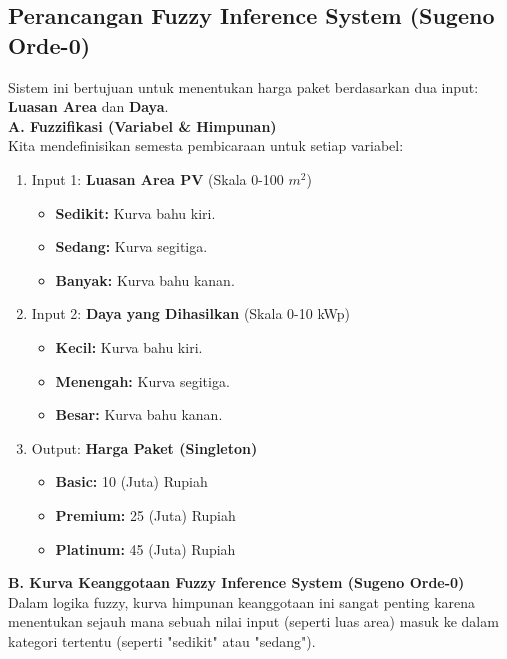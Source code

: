 \documentclass{article}
\begin{document}
\subsection*{Perancangan Fuzzy Inference System (Sugeno Orde-0)}
Sistem ini bertujuan untuk menentukan harga paket berdasarkan dua input: \textbf{Luasan Area} dan \textbf{Daya}.
\\
\textbf{A. Fuzzifikasi (Variabel & Himpunan)}\\
Kita mendefinisikan semesta pembicaraan untuk setiap variabel:
\begin{enumerate}
    \item Input 1: \textbf{Luasan Area PV} (Skala 0-100 $m^2$)
    \begin{itemize}
        \item \textbf{Sedikit:} Kurva bahu kiri.
        \item \textbf{Sedang:} Kurva segitiga.
        \item \textbf{Banyak:} Kurva bahu kanan.
    \end{itemize}

    \item Input 2: \textbf{Daya yang Dihasilkan} (Skala 0-10 kWp)
    \begin{itemize}
        \item \textbf{Kecil:} Kurva bahu kiri.
        \item \textbf{Menengah:} Kurva segitiga.
        \item \textbf{Besar:} Kurva bahu kanan.
    \end{itemize}

    \item Output: \textbf{Harga Paket (Singleton)}
    \begin{itemize}
        \item \textbf{Basic:} 10 (Juta) Rupiah
        \item \textbf{Premium:} 25 (Juta) Rupiah
        \item \textbf{Platinum:} 45 (Juta) Rupiah
    \end{itemize}
\end{enumerate}

\textbf{B. Kurva Keanggotaan Fuzzy Inference System (Sugeno Orde-0)}\\
Dalam logika fuzzy, kurva himpunan keanggotaan ini sangat penting karena menentukan sejauh mana sebuah nilai input (seperti luas area) masuk ke dalam kategori tertentu (seperti "sedikit" atau "sedang"). \\
\end{document}
